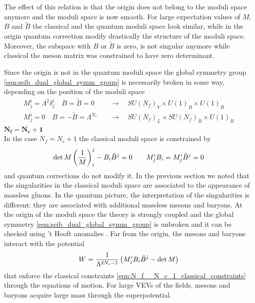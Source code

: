 The effect of this relation is that the origin  does not belong to the moduli space anymore and the moduli space is now smooth.
For large expectation values of $M$, $B$ and $\tilde{B}$ the classical and the quantum moduli space look similar, while in the origin quantum correction modify drastically the structure of the moduli space.
Moreover, the subspace with $B$ or $\tilde{B}$ is zero, is not singular anymore while classical the meson matrix was constrained to have zero determinant. 

Since the origin is not in the quantum moduli space the global symmetry group \eqref{eqn:seib_dual_global_symm_group} is necessarily broken in some way, depending on the position of the moduli space 
\begin{align}
M^i_j = \Lambda^2 \delta^i_j \quad B=\tilde{B}= 0 \quad & \rightarrow  \quad SU(N_f)_V \times U(1)_B \times U(1)_R\\
M^i_j = 0 \quad B=-\tilde{B}= \Lambda^{N_c} \quad & \rightarrow  \quad SU(N_f)_L \times SU(N_f)_R \times U(1)_R
\end{align}
$\mathbf{N_f = N_c +1}$
\\
In the case $N_f = N_c +1 $ the classical moduli space is constrained by
\begin{equation}
 \mathrm{det } \,{M} \left( \frac{1}{M}\right)^j_i - B_i \tilde{B}^j = 0 \qquad
 M^i_j B_i = M^i_j \tilde{B}^j = 0 
 \label{eqn:N_f__N_c_1_classical_constraints}
\end{equation}
and quantum corrections do not modify it.
In the previous section we noted that the singularities in the classical moduli space are associated to the appearance of massless gluons.
In the quantum picture, the interpretation of the singularities is different: they are associated with additional massless mesons and baryons.
At the origin of the moduli space the theory is strongly coupled and the global symmetry \eqref{eqn:seib_dual_global_symm_group} is unbroken and it can be checked using 't Hooft anomalies \cite{Seiberg:1994bz}.
Far from the origin, the mesons and baryons interact with the potential 
\begin{equation}
W = \frac{1}{\Lambda^{2 N_c -1}} \left( M^i_j B_i \tilde{B}^j - \mathrm{det } \,{M} \right)
\end{equation}
that enforce the classical constraints \eqref{eqn:N_f__N_c_1_classical_constraints} through the equations of motion.
For large VEVs of the fields, mesons and baryons acquire large mass through the superpotential.
\\
\\
